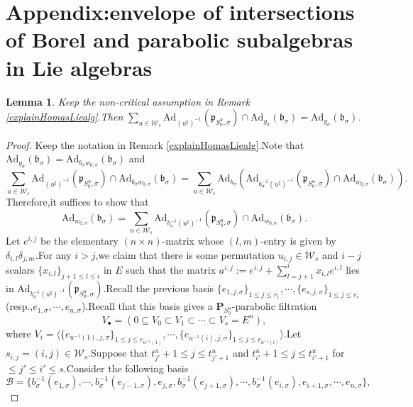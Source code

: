 \documentclass[10pt]{article}
\newtheorem{lem}[thm]{Lemma}
\newcommand{\bP}{{\mathbf{P}}}
\newcommand{\cB}{\mathcal B}
\newcommand{\fb}{{\mathfrak{b}}}
\newcommand{\fp}{{\mathfrak{p}}}
\newcommand{\sW}{\mathscr W}
\begin{document}
\section{Appendix:\;envelope of intersections of Borel and parabolic subalgebras  in Lie algebras}\label{reproofforinfinite}




\begin{lem}\label{Inifinitefernpoten} Keep the non-critical assumption in Remark \ref{explainHomasLiealg}.\;Then $\sum_{u\in \sW_s}\mathrm{Ad}_{(u^{\sharp})^{-1}}(\fp_{S^u_0,\sigma})\cap \mathrm{Ad}_{g_{\sigma}}(\fb_{\sigma})=\mathrm{Ad}_{g_{\sigma}}(\fb_{\sigma})$.\;
\end{lem}
\begin{proof}Keep the notation in Remark \ref{explainHomasLiealg}.\;Note that $\mathrm{Ad}_{g_{\sigma}}(\fb_{\sigma})=\mathrm{Ad}_{b_{\sigma}w_{0,\sigma}}(\fb_{\sigma})$ and 
\[\sum_{u\in \sW_s}\mathrm{Ad}_{(u^{\sharp})^{-1}}(\fp_{S^u_0,\sigma})\cap \mathrm{Ad}_{b_{\sigma}w_{0,\sigma}}(\fb_{\sigma})=\sum_{u\in \sW_s}\mathrm{Ad}_{b_{\sigma}}(\mathrm{Ad}_{b_{\sigma}^{-1}(u^{\sharp})^{-1}}(\fp_{S^u_0,\sigma})\cap \mathrm{Ad}_{w_{0,\sigma}}(\fb_{\sigma})).\;\]
Therefore,\;it suffices to show that 
 \[\mathrm{Ad}_{w_{0,\sigma}}(\fb_{\sigma})=\sum_{u\in \sW_s}\mathrm{Ad}_{b_{\sigma}^{-1}(u^{\sharp})^{-1}}(\fp_{S^u_0,\sigma})\cap \mathrm{Ad}_{w_{0,\sigma}}(\fb_{\sigma}).\]
 Let $e^{i,j}$ be the elementary $(n\times n)$-matrix whose $(l,m)$-entry is given by $\delta_{i,l}\delta_{j,m}$.\;For any $i>j$,\;we claim that there is some permutation
$u_{i,j}\in\sW_s$ and $i-j$ scalars $\{x_{i,l}\}_{j+1\leq l\leq i}$ in $E$ such that the matrix $a^{i,j}:=e^{i,j}+\sum_{l=j+1}^ix_{i,l}e^{i,l}$ lies in $\mathrm{Ad}_{b_{\sigma}^{-1}(u^{\sharp})^{-1}}(\fp_{S^u_0,\sigma})$.\;Recall the previous basis 
$\{e_{1,j,\sigma}\}_{1\leq j\leq r_1},\cdots,\{e_{s,j,\sigma}\}_{1\leq j\leq r_s}$ (resp.,\;$e_{1,\sigma},\cdots,e_{n,\sigma}$).\;Recall that this basis gives a $\bP_{S^u_0}$-parabolic filtration 
\[V_{\bullet}=(0\subseteq V_0\subset V_1\subset\cdots\subset V_s=E^n),\]
 where $V_i=\langle \{e_{u^{-1}(1),j,\sigma}\}_{1\leq j\leq r_{u^{-1}(1)}},\cdots,\{e_{u^{-1}(i),j,\sigma}\}_{1\leq j\leq r_{u^{-1}(i)}}\rangle$.\;Let $s_{i,j}=(i,j)\in \sW_s$.\;Suppose that $t^u_{j'}+1\leq j\leq t^u_{j'+1}$ and $t^u_{i'}+1\leq j\leq t^u_{i'+1}$ for $\leq j'\leq i'\leq s$.\;Consider the following basis 
\[\cB=\{b^{-1}_{\sigma}(e_{1,\sigma}),\cdots,b^{-1}_{\sigma}(e_{j-1,\sigma}),e_{j,\sigma},b^{-1}_{\sigma}(e_{j+1,\sigma}),\cdots,b^{-1}_{\sigma}(e_{i,\sigma}),e_{i+1,\sigma},\cdots,e_{n,\sigma}\},\]

\end{proof}
\end{document}
